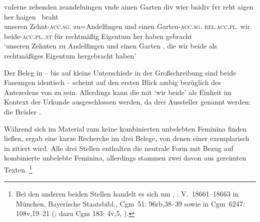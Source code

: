 \begin{exe}
\ex \label{ex:cao_samegend_inan_mm_beidiu}
		\gll vnſerne zehenden zeandeluingen vnde ainen Garten \textelp{} div
				wier baidiv fvr reht aigen her haigen~ braht \\
			unseren Zehnt-\textsc{acc.sg}.\MascI{} zu=Andelfingen und einen
				Garten-\textsc{acc.sg.\MascI} {} \textsc{rel.acc.pl.\NeutI} wir
				beide-\textsc{acc.pl.\NeutI.st} für rechtmäßig Eigentum her
				haben gebracht \\
		\trans `unseren Zehnten zu Andelfingen und einen Garten \textelp{},
			die wir beide als recht\-mäßiges Eigentum hergebracht haben'
			\parencites(Nrn.~1201~AB, Kl.~Heiligkreuztal, Kr.~Biberach,
				1290)[472,10--18]{cao2}

\end{exe}

Der Beleg in  -- bis auf kleine
Unterschiede in der Großschreibung sind beide Fassungen identisch -- scheint
auf den ersten Blick ambig bezüglich des Antezedens von
 zu sein. Allerdings kann die  mit 
`wir beide' als Einheit im Kontext der Urkunde ausgeschlossen
werden, da drei Aussteller genannt werden: die Brüder  \autocites(Nrn.~1201~AB)[472,7]{cao2}.

Während sich im Material zum \CAO{} keine kombinierten unbelebten Feminina
finden ließen, ergab eine kurze Recherche im \REM{} drei Belege, von denen
einer exemplarisch in  zitiert wird. Alle drei Stellen
enthalten die neutrale Form  mit Bezug auf kombinierte unbelebte
Feminina, allerdings stammen zwei davon aus gereimten Texten.%
%
	\footnote{Bei den anderen beiden Stellen handelt es sich um
		, : V.~18661--18663 in
		München, Bayerische Staatsbibl., Cgm~51: 96rb,38--39
		\autocites[vgl.][259]{maroldschroeder1969}[M342]{rem} sowie
		 in
		Cgm~6247: 108v,19--21 (\cite[vgl.][M401]{rem}; dazu
		Cgm 183: 4v,5, \cite[vgl.][M405Y]{rem}).}

